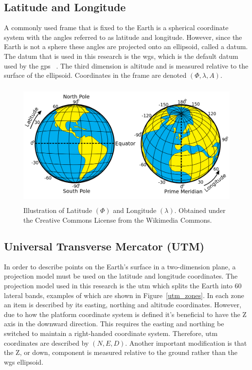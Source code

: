 \subsection{Latitude and Longitude}

A commonly used frame that is fixed to the Earth is a spherical coordinate system with the angles referred to as latitude and longitude. However, since the Earth is not a sphere these angles are projected onto an ellipsoid, called a datum.  The datum that is used in this research is the \ac{wgs}, which is the default datum used by the \acf{gps} ~\citep{datums:2016}.  The third dimension is altitude and is measured relative to the surface of the ellipsoid.  Coordinates in the frame are denoted $(\Phi, \lambda, A)$.

\begin{figure}
	\centering
    \includegraphics[height=2.5in]{figures/latitudelongitude.png}
    \caption[Latitude and longitude]{Illustration of Latitude $(\Phi)$ and Longitude $(\lambda)$. Obtained under the Creative Commons License from the Wikimedia Commons.}
\end{figure}

\subsection{Universal Transverse Mercator (UTM)}
\label{section:utm}

In order to describe points on the Earth's surface in a two-dimension plane, a projection model must be used on the latitude and longitude coordinates.  The projection model used in this research is the \acf{utm} which splits the Earth into 60 lateral bands, examples of which are shown in Figure~\ref{utm_zones}.  In each zone an item is described by its easting, northing and altitude coordinates.  However, due to how the platform coordinate system is defined it's beneficial to have the Z axis in the downward direction.  This requires the easting and northing be switched to maintain a right-handed coordinate system. Therefore, \acf{utm} coordinates are described by $(N,E,D)$.  Another important modification is that the Z, or down, component is measured relative to the ground rather than the \ac{wgs} ellipsoid. 

